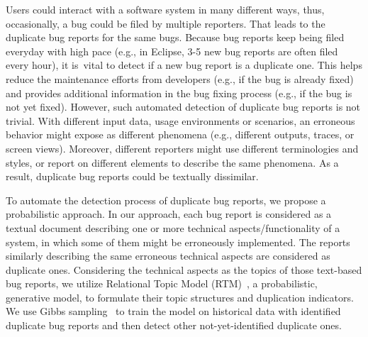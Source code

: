 Users could interact with a software system in many different ways,
thus, occasionally, a bug could be filed by multiple reporters. That
leads to the duplicate bug reports for the same bugs.
%
%
Because bug reports keep being filed everyday with high pace (e.g., in
Eclipse, 3-5 new bug reports are often filed every hour), it is~vital
to detect if a new bug report is a duplicate one. This
helps reduce the maintenance efforts from developers
(e.g., if the bug is already fixed) and provides additional
information in the bug fixing process (e.g., if the bug is not yet
fixed). 
%
However, such automated detection of duplicate bug reports is not
trivial.
%
With different input data, usage environments or scenarios, an
erroneous behavior might expose as different phenomena (e.g.,
different outputs, traces, or screen views). Moreover, different
reporters might use different terminologies and styles, or report on
different elements to describe the same phenomena. As a result,
duplicate bug reports could be textually dissimilar.



To automate the detection process of duplicate bug reports, we propose
a probabilistic approach. In our approach, each bug report is
considered as a textual document describing one or more technical
aspects/functionality of a system, in which some of them might be
erroneously implemented. The reports similarly describing the same
erroneous technical aspects are considered as duplicate
ones. Considering the technical aspects as the topics of those
text-based bug reports, we utilize Relational Topic Model
(RTM)~\cite{RTM}, a probabilistic, generative model, to formulate
their topic structures and duplication indicators. We use Gibbs
sampling~\cite{gibb} to train the model on historical data with
identified duplicate bug reports and then detect other
not-yet-identified duplicate ones.

